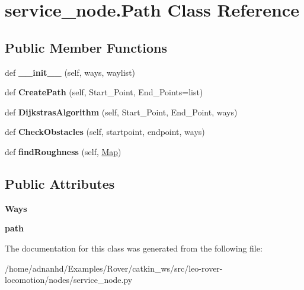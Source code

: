 \hypertarget{classservice__node_1_1Path}{}\section{service\+\_\+node.\+Path Class Reference}
\label{classservice__node_1_1Path}
\subsection*{Public Member Functions}
\begin{DoxyCompactItemize}
\item 
\mbox{\label{classservice__node_1_1Path_ac66df455e00a98279d5db61985b8b3ff}} 
def {\bfseries \+\_\+\+\_\+init\+\_\+\+\_\+} (self, ways, waylist)
\item 
\mbox{\label{classservice__node_1_1Path_a9947fd0a2a144ef57cd75ed3f68829e0}} 
def {\bfseries Create\+Path} (self, Start\+\_\+\+Point, End\+\_\+\+Points=list)
\item 
\mbox{\label{classservice__node_1_1Path_a6c2a4122062c23d7789375230a01f2bd}} 
def {\bfseries Dijkstras\+Algorithm} (self, Start\+\_\+\+Point, End\+\_\+\+Point, ways)
\item 
\mbox{\label{classservice__node_1_1Path_a39a4cd3962fbe30c2c3d835d23b6eff9}} 
def {\bfseries Check\+Obstacles} (self, startpoint, endpoint, ways)
\item 
\mbox{\label{classservice__node_1_1Path_a8cf17afe9bdbb156da13e24707f3df38}} 
def {\bfseries find\+Roughness} (self, \hyperlink{classservice__node_1_1Map}{Map})
\end{DoxyCompactItemize}
\subsection*{Public Attributes}
\begin{DoxyCompactItemize}
\item 
\mbox{\label{classservice__node_1_1Path_a9d0a619d0d0fd5f2167b5229cbf65818}} 
{\bfseries Ways}
\item 
\mbox{\label{classservice__node_1_1Path_a78a66c2a039df6318fe31aa7da84754b}} 
{\bfseries path}
\end{DoxyCompactItemize}


The documentation for this class was generated from the following file\+:\begin{DoxyCompactItemize}
\item 
/home/adnanhd/\+Examples/\+Rover/catkin\+\_\+ws/src/leo-\/rover-\/locomotion/nodes/service\+\_\+node.\+py\end{DoxyCompactItemize}
